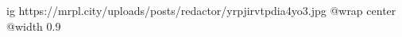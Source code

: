  
 
 
 
 

\ifcmt
  ig https://mrpl.city/uploads/posts/redactor/yrpjirvtpdia4yo3.jpg
  @wrap center
  @width 0.9
\fi
